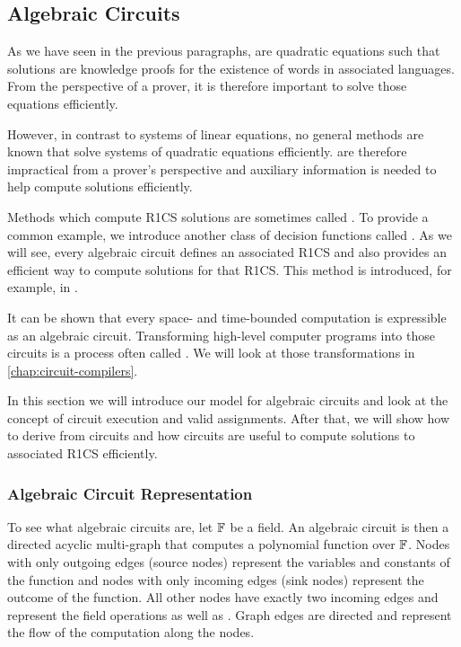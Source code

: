 \subsection{Algebraic Circuits}
\label{sec:circuits} As we have seen in the previous paragraphs,  are quadratic equations such that solutions are knowledge proofs for the existence of words in associated languages. From the perspective of a prover, it is therefore important to solve those equations efficiently. 

However,  in contrast to systems of linear equations, no general methods are known that solve systems of quadratic equations efficiently.  are therefore impractical from a prover's perspective and auxiliary information is needed to help compute solutions efficiently.

Methods which compute R1CS solutions are sometimes called .  To provide a common example, we introduce another class of decision functions called . As we will see, every algebraic circuit defines an associated R1CS and also provides an efficient way to compute solutions for that R1CS. This method is introduced, for example, in \cite{sasson-2013}.

It can be shown that every space- and time-bounded computation is expressible as an algebraic circuit. Transforming high-level computer programs into those circuits is a process often called . We will look at those transformations in \chaptname{} \ref{chap:circuit-compilers}.

In this section we will introduce our model for algebraic circuits and look at the concept of circuit execution and valid assignments. After that, we will show how to derive  from circuits and how circuits are useful to compute solutions to associated R1CS efficiently.
\subsubsection{Algebraic Circuit Representation} To see what algebraic circuits are, let $\mathbb{F}$ be a field. An algebraic circuit is then a directed acyclic multi-graph that computes a polynomial function over $\mathbb{F}$. Nodes with only outgoing edges (source nodes) represent the variables and constants of the function and nodes with only incoming edges (sink nodes) represent the outcome of the function. All other nodes have exactly two incoming edges and represent the field operations  as well as . Graph edges are directed and represent the flow of the computation along the nodes.

